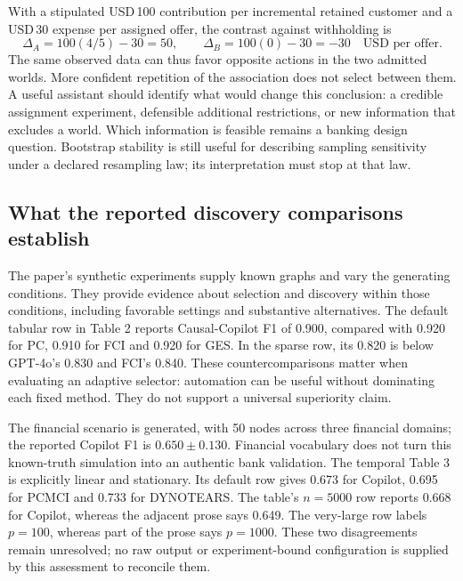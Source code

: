 With a stipulated USD\,100 contribution per incremental retained customer and
a USD\,30 expense per assigned offer, the contrast against withholding is
\begin{equation}
 \Delta_A=100(4/5)-30=50,\qquad
 \Delta_B=100(0)-30=-30\quad\text{USD per offer}.
 \label{exec17:copilot-value}
\end{equation}
The same observed data can thus favor opposite actions in the two admitted
worlds. More confident repetition of the association does not select between
them. A useful assistant should identify what would change this conclusion:
a credible assignment experiment, defensible additional restrictions, or new
information that excludes a world. Which information is feasible remains a
banking design question. Bootstrap stability is still useful for describing
sampling sensitivity under a declared resampling law; its interpretation must
stop at that law.~\citep{exec17_copilot_exact}

\subsection{What the reported discovery comparisons establish}

The paper's synthetic experiments supply known graphs and vary the generating
conditions. They provide evidence about selection and discovery within those
conditions, including favorable settings and substantive alternatives. The
default tabular row in Table 2 reports Causal-Copilot F1 of 0.900, compared with
0.920 for PC, 0.910 for FCI and 0.920 for GES. In the sparse row, its 0.820 is
below GPT-4o's 0.830 and FCI's 0.840. These countercomparisons matter when
evaluating an adaptive selector: automation can be useful without dominating
each fixed method. They do not support a universal superiority claim.
\citep{exec17_copilot_paper}

The financial scenario is generated, with 50 nodes across three financial
domains; the reported Copilot F1 is $0.650\pm0.130$. Financial vocabulary does
not turn this known-truth simulation into an authentic bank validation. The
temporal Table 3 is explicitly linear and stationary. Its default row gives
0.673 for Copilot, 0.695 for PCMCI and 0.733 for DYNOTEARS. The table's
$n=5000$ row reports 0.668 for Copilot, whereas the adjacent prose says 0.649.
The very-large row labels $p=100$, whereas part of the prose says $p=1000$.
These two disagreements remain unresolved; no raw output or experiment-bound
configuration is supplied by this assessment to reconcile them.
\citep{exec17_copilot_paper}

